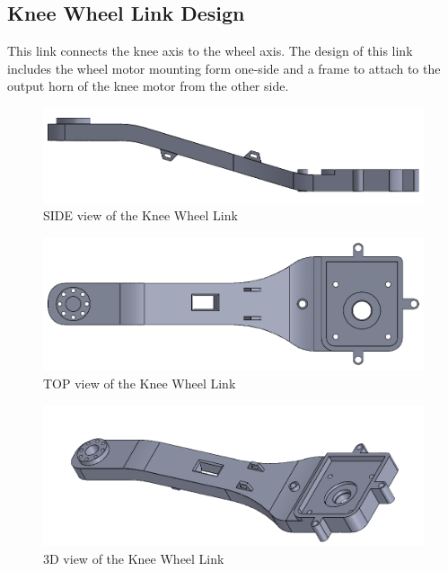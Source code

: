 \subsection{Knee Wheel Link Design}
This link connects the knee axis to the wheel axis. The design of this link includes the wheel motor mounting form one-side and a frame to attach to the output horn of the knee motor from the other side.
\begin{figure}[h]
	\centering
	\includegraphics[width=1\linewidth]{Wheel_Knee_Link_1}
	\caption[SIDE view of the Knee Wheel Link]{SIDE view of the Knee Wheel Link}
	\label{fig:wheelkneelink1}
\end{figure}
\begin{figure}[h]
	\centering
	\includegraphics[width=1\linewidth]{Wheel_Knee_Link_2}
	\caption[TOP view of the Knee Wheel Link]{TOP view of the Knee Wheel Link}
	\label{fig:wheelkneelink2}
\end{figure}
\begin{figure}[h]
	\centering
	\includegraphics[width=1\linewidth]{Wheel_Knee_Link_3}
	\caption[3D view of the Knee Wheel Link]{3D view of the Knee Wheel Link}
	\label{fig:wheelkneelink3}
\end{figure}

